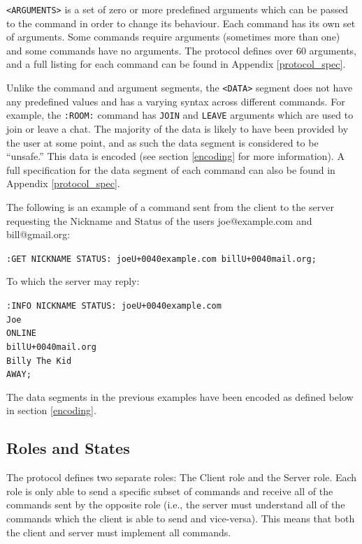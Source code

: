 \texttt{<ARGUMENTS>} is a set of zero or more predefined arguments which can be passed to the command in order to change its behaviour. Each command has its own set of arguments. Some commands require arguments (sometimes more than one) and some commands have no arguments. The protocol defines over 60 arguments, and a full listing for each command can be found in Appendix \ref{protocol_spec}.

Unlike the command and argument segments, the \texttt{<DATA>} segment does not have any predefined values and has a varying syntax across different commands.  For example, the \texttt{:ROOM:} command has \texttt{JOIN} and \texttt{LEAVE} arguments which are used to join or leave a chat. The majority of the data is likely to have been provided by the user at some point, and as such the data segment is considered to be ``unsafe.'' This data is encoded (see section \ref{encoding} for more information). A full specification for the data segment of each command can also be found in Appendix \ref{protocol_spec}.

The following is an example of a command sent from the client to the server requesting the Nickname and Status of the users joe@example.com and bill@gmail.org:

\texttt{:GET NICKNAME STATUS: joe\SLASH U+0040example.com bill\SLASH U+0040mail.org;}

To which the server may reply:

\texttt{:INFO NICKNAME STATUS: joe\SLASH U+0040example.com\\
Joe\\
ONLINE\\
bill\SLASH U+0040mail.org\\
Billy The Kid\\
AWAY;}

The data segments in the previous examples have been encoded as defined below in section \ref{encoding}.

\subsection{Roles and States}

The protocol defines two separate roles: The Client role and the Server role. Each role is only able to send a specific subset of commands and receive all of the commands sent by the opposite role (i.e., the server must understand all of the commands which the client is able to send and vice-versa). This means that both the client and server must implement all commands.

